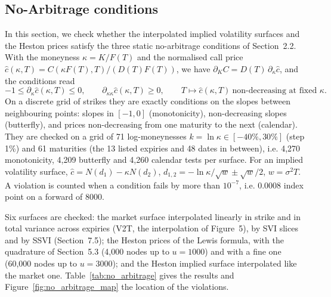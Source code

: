 \subsection{No-Arbitrage conditions}
In this section, we check whether the interpolated implied volatility surfaces and the Heston prices satisfy the
three static no-arbitrage conditions of Section~2.2. With the moneyness $\kappa = K/F(T)$ and the normalised call
price $\hat c(\kappa, T) = C(\kappa F(T), T) / (D(T) F(T))$, we have $\partial_K C = D(T)\,\partial_\kappa \hat c$, and the
conditions read
\begin{equation}
-1 \le \partial_\kappa \hat c(\kappa, T) \le 0, \qquad \partial_{\kappa\kappa} \hat c(\kappa, T) \ge 0, \qquad
T \mapsto \hat c(\kappa, T) \ \text{non-decreasing at fixed } \kappa .
\end{equation}
On a discrete grid of strikes they are exactly conditions on the slopes between neighbouring points: slopes in
$[-1, 0]$ (monotonicity), non-decreasing slopes (butterfly), and prices non-decreasing from one maturity to the next
(calendar). They are checked on a grid of 71 log-moneynesses $k = \ln\kappa \in [-40\%, 30\%]$ (step 1\%) and 61
maturities (the 13 listed expiries and 48 dates in between), i.e. 4{,}270 monotonicity, 4{,}209 butterfly and 4{,}260
calendar tests per surface. For an implied volatility surface,
$\hat c = N(d_1) - \kappa N(d_2)$, $d_{1,2} = -\ln\kappa / \sqrt{w} \pm \sqrt{w}/2$, $w = \sigma^2 T$. A violation is counted
when a condition fails by more than $10^{-7}$, i.e. 0.0008 index point on a forward of 8000.

Six surfaces are checked: the market surface interpolated linearly in strike and in total variance across expiries
(V2T, the interpolation of Figure~5), by SVI slices and by SSVI (Section~7.5); the Heston prices of the Lewis formula,
with the quadrature of Section~5.3 (4{,}000 nodes up to $u = 1000$) and with a fine one (60{,}000 nodes up to
$u = 3000$); and the Heston implied surface interpolated like the market one. Table~\ref{tab:no_arbitrage} gives the
results and Figure~\ref{fig:no_arbitrage_map} the location of the violations.

